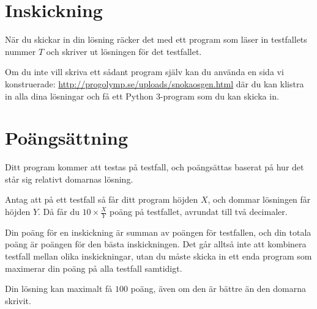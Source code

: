 \section*{Inskickning}
När du skickar in din lösning räcker det med ett program som läser in testfallets nummer $T$ och skriver ut lösningen för det testfallet.

Om du inte vill skriva ett sådant program själv kan du använda en sida vi konstruerade: \url{http://progolymp.se/uploads/snokaosgen.html} där du kan klistra in
alla dina lösningar och få ett Python 3-program som du kan skicka in.

\section*{Poängsättning}
Ditt program kommer att testas på testfall, och poängsättas baserat på hur det står sig relativt domarnas lösning.

Antag att på ett testfall så får ditt program höjden $X$, och dommar lösningen får höjden $Y$. Då får du $10 \times \frac{X}{Y}$ poäng på testfallet, avrundat till två decimaler.

Din poäng för en inskickning är summan av poängen för testfallen, och din totala poäng är poängen för den bästa inskickningen. Det går alltså inte att kombinera testfall mellan olika inskickningar, utan du måste skicka in ett enda program som maximerar din poäng på alla testfall samtidigt.

Din lösning kan maximalt få $100$ poäng, även om den är bättre än den domarna skrivit.